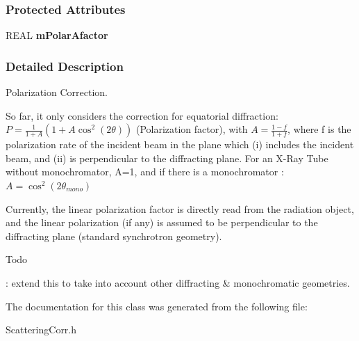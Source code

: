 \subsubsection*{\-Protected \-Attributes}
\begin{DoxyCompactItemize}
\item 
\-R\-E\-A\-L {\bfseries m\-Polar\-Afactor}\label{a00061_a8a0115cf6d539ede891056f94b6887cf}

\end{DoxyCompactItemize}


\subsubsection{\-Detailed \-Description}
\-Polarization \-Correction. 

\-So far, it only considers the correction for equatorial diffraction\-: $ P = \frac{1}{1+A}\left(1+A\cos^2(2\theta)\right) $ (\-Polarization factor), with $ A = \frac{1-f}{1+f} $, where f is the polarization rate of the incident beam in the plane which (i) includes the incident beam, and (ii) is perpendicular to the diffracting plane. \-For an \-X-\/\-Ray \-Tube without monochromator, \-A=1, and if there is a monochromator \-: $ A = \cos^2(2\theta_{mono}) $

\-Currently, the linear polarization factor is directly read from the radiation object, and the linear polarization (if any) is assumed to be perpendicular to the diffracting plane (standard synchrotron geometry).

\begin{DoxyRefDesc}{\-Todo}
\item[{\bf \-Todo}]\-: extend this to take into account other diffracting \& monochromatic geometries. \end{DoxyRefDesc}


\-The documentation for this class was generated from the following file\-:\begin{DoxyCompactItemize}
\item 
\-Scattering\-Corr.\-h\end{DoxyCompactItemize}
